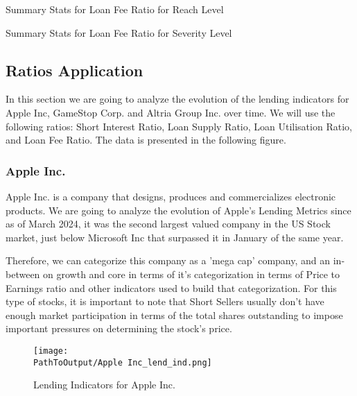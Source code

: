 \begin{table}[H]
\caption{Summary Stats for Loan Fee Ratio for Reach Level}
\centering

\label{table:loan_fee_reach.tex}
\end{table}

\begin{table}[H]
\caption{Summary Stats for Loan Fee Ratio for Severity Level}
\centering

\label{table:loan_fee_severity.tex}
\end{table}




\subsection{Ratios Application}

In this section we are going to analyze the evolution of the lending indicators for Apple Inc, GameStop Corp. and Altria Group Inc. over time. We will use the following ratios: Short Interest Ratio, Loan Supply Ratio, Loan Utilisation Ratio, and Loan Fee Ratio. The data is presented in the following figure.

\subsubsection{Apple Inc.}

Apple Inc. is a company that designs, produces and commercializes electronic products. We are going to analyze the evolution of Apple's Lending Metrics since as of March 2024, it was the second largest valued company in the US Stock market, just below Microsoft Inc that surpassed it in January of the same year.

Therefore, we can categorize this company as a 'mega cap' company, and an in-between on growth and core in terms of it's categorization in terms of Price to Earnings ratio and other indicators used to build that categorization. For this type of stocks, it is important to note that Short Sellers usually don't have enough market participation in terms of the total shares outstanding to impose important pressures on determining the stock's price.

\begin{figure}[H]
\centering
\caption{Lending Indicators for Apple Inc.}
  \centering
  \texttt{[image: \\PathToOutput/Apple Inc\_lend\_ind.png]}
\label{fig:apple_lending_indicators}
\end{figure}

